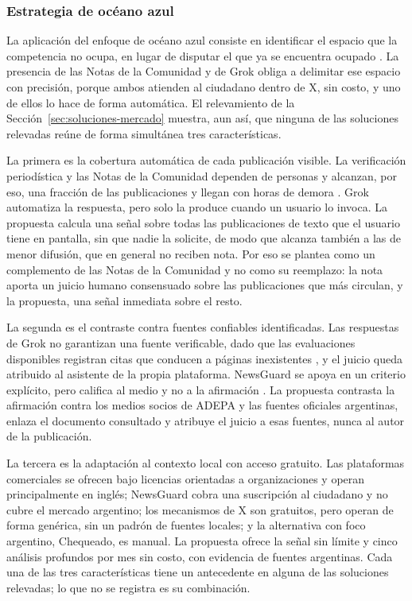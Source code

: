 \FloatBarrier
\subsubsection{Estrategia de océano azul}
\label{sec:oceano-azul}

La aplicación del enfoque de océano azul consiste en identificar el espacio que la competencia no ocupa, en lugar de disputar el que ya se encuentra ocupado \parencite{KimMauborgne2015}. La presencia de las Notas de la Comunidad y de Grok obliga a delimitar ese espacio con precisión, porque ambos atienden al ciudadano dentro de X, sin costo, y uno de ellos lo hace de forma automática. El relevamiento de la Sección~\ref{sec:soluciones-mercado} muestra, aun así, que ninguna de las soluciones relevadas reúne de forma simultánea tres características.

La primera es la cobertura automática de cada publicación visible. La verificación periodística y las Notas de la Comunidad dependen de personas y alcanzan, por eso, una fracción de las publicaciones y llegan con horas de demora \parencite{SlaughterEtAl2025}. Grok automatiza la respuesta, pero solo la produce cuando un usuario lo invoca. La propuesta calcula una señal sobre todas las publicaciones de texto que el usuario tiene en pantalla, sin que nadie la solicite, de modo que alcanza también a las de menor difusión, que en general no reciben nota. Por eso se plantea como un complemento de las Notas de la Comunidad y no como su reemplazo: la nota aporta un juicio humano consensuado sobre las publicaciones que más circulan, y la propuesta, una señal inmediata sobre el resto.

La segunda es el contraste contra fuentes confiables identificadas. Las respuestas de Grok no garantizan una fuente verificable, dado que las evaluaciones disponibles registran citas que conducen a páginas inexistentes \parencite{JazwinskaChandrasekar2025}, y el juicio queda atribuido al asistente de la propia plataforma. NewsGuard se apoya en un criterio explícito, pero califica al medio y no a la afirmación \parencite{NewsGuard2026}. La propuesta contrasta la afirmación contra los medios socios de ADEPA y las fuentes oficiales argentinas, enlaza el documento consultado y atribuye el juicio a esas fuentes, nunca al autor de la publicación.

La tercera es la adaptación al contexto local con acceso gratuito. Las plataformas comerciales se ofrecen bajo licencias orientadas a organizaciones y operan principalmente en inglés; NewsGuard cobra una suscripción al ciudadano y no cubre el mercado argentino; los mecanismos de X son gratuitos, pero operan de forma genérica, sin un padrón de fuentes locales; y la alternativa con foco argentino, Chequeado, es manual. La propuesta ofrece la señal sin límite y cinco análisis profundos por mes sin costo, con evidencia de fuentes argentinas. Cada una de las tres características tiene un antecedente en alguna de las soluciones relevadas; lo que no se registra es su combinación.

